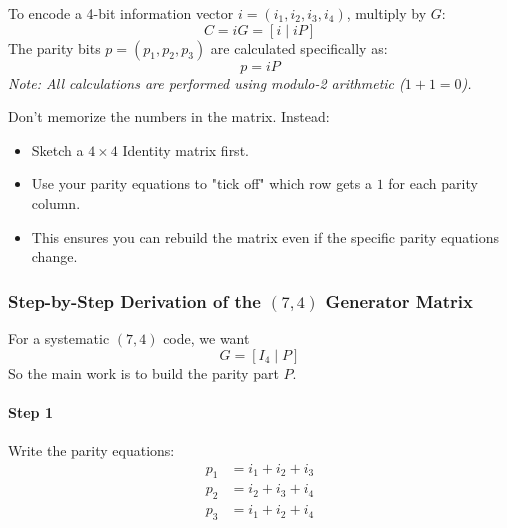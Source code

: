 \documentclass[11pt,a4paper]{book}
\newenvironment{formulabox}[1][Formula]{%
    \begin{tcolorbox}[
        enhanced,
        breakable,
        colback=softcoral!10,
        colframe=softcoral!200,
        title=#1,
        fonttitle=\bfseries,
        coltitle=white,
        sharp corners,
        boxrule=1pt,
        left=8pt,
        right=8pt,
        top=6pt,
        bottom=6pt
    ]
}{\end{tcolorbox}}
\newenvironment{infobox}[1][Information]{%
    \begin{tcolorbox}[
        enhanced,
        breakable,
        colback=mintgreen!10,
        colframe=mintgreen!200,
        title=#1,
        fonttitle=\bfseries,
        sharp corners,
        boxrule=0.8pt,
        left=8pt,
        right=8pt,
        top=6pt,
        bottom=6pt
    ]
}{\end{tcolorbox}}
\begin{document}
\begin{formulabox}[Using the Generator Matrix]
To encode a 4-bit information vector $i = (i_1, i_2, i_3, i_4)$, multiply by $G$:
\[
C = iG = [i \mid iP]
\]
The parity bits $p = (p_1, p_2, p_3)$ are calculated specifically as:
\[
p = iP
\]
\textit{Note: All calculations are performed using modulo-2 arithmetic ($1+1=0$).}
\end{formulabox}

\begin{infobox}[Exam Tip: Rebuilding $G$]
Don't memorize the numbers in the matrix. Instead:
\begin{itemize}
    \item Sketch a $4 \times 4$ Identity matrix first.
    \item Use your parity equations to "tick off" which row gets a $1$ for each parity column.
    \item This ensures you can rebuild the matrix even if the specific parity equations change.
\end{itemize}
\end{infobox}

\subsubsection{Step-by-Step Derivation of the \((7,4)\) Generator Matrix}

For a systematic \((7,4)\) code, we want
\[
G=[I_4\mid P]
\]
So the main work is to build the parity part \(P\).

\paragraph{Step 1}
Write the parity equations:
\begin{align*}
p_1 &= i_1+i_2+i_3\\
p_2 &= i_2+i_3+i_4\\
p_3 &= i_1+i_2+i_4
\end{align*}
\end{document}
